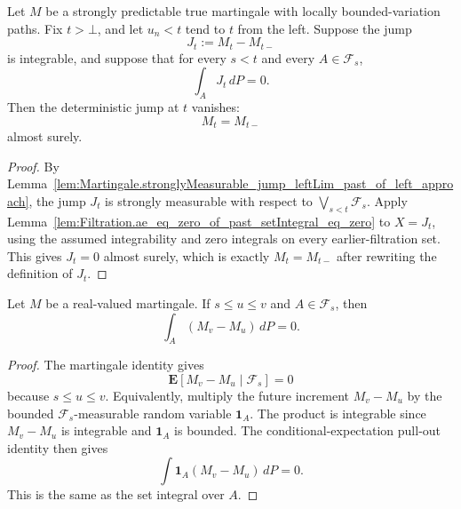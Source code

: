 \begin{lemma}\label{lem:Martingale.ae_eq_leftLim_of_left_approach_past_setIntegral_zero}
Let \(M\) be a strongly predictable true martingale with locally
bounded-variation paths.  Fix \(t>\bot\), and let \(u_n<t\) tend to \(t\)
from the left.  Suppose the jump
\[
  J_t:=M_t-M_{t-}
\]
is integrable, and suppose that for every \(s<t\) and every
\(A\in\mathcal F_s\),
\[
  \int_A J_t\,dP=0 .
\]
Then the deterministic jump at \(t\) vanishes:
\[
  M_t=M_{t-}
\]
almost surely.
\end{lemma}

\begin{proof}
By
Lemma~\ref{lem:Martingale.stronglyMeasurable_jump_leftLim_past_of_left_approach},
the jump \(J_t\) is strongly measurable with respect to
\(\bigvee_{s<t}\mathcal F_s\).  Apply
Lemma~\ref{lem:Filtration.ae_eq_zero_of_past_setIntegral_eq_zero} to
\(X=J_t\), using the assumed integrability and zero integrals on every
earlier-filtration set.  This gives \(J_t=0\) almost surely, which is exactly
\(M_t=M_{t-}\) after rewriting the definition of \(J_t\).
\end{proof}

\begin{lemma}\label{lem:Martingale.setIntegral_increment_eq_zero_of_measurableSet}
Let \(M\) be a real-valued martingale.  If \(s\le u\le v\) and
\(A\in\mathcal F_s\), then
\[
  \int_A (M_v-M_u)\,dP=0 .
\]
\end{lemma}

\begin{proof}
The martingale identity gives
\[
  \mathbf E[M_v-M_u\mid\mathcal F_s]=0
\]
because \(s\le u\le v\).  Equivalently, multiply the future increment
\(M_v-M_u\) by the bounded \(\mathcal F_s\)-measurable random variable
\(\mathbf 1_A\).  The product is integrable since \(M_v-M_u\) is integrable
and \(\mathbf 1_A\) is bounded.  The conditional-expectation pull-out
identity then gives
\[
  \int \mathbf 1_A(M_v-M_u)\,dP=0 .
\]
This is the same as the set integral over \(A\).
\end{proof}

